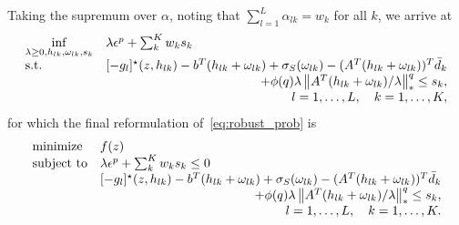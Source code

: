 Taking the supremum over $\alpha$, noting that $\sum_{l=1}^L \alpha_{lk} = w_k$ for all $k$, we arrive at
\begin{equation*}
\begin{aligned}
\begin{array}[t]{ll}
\underset{\lambda \geq 0, h_{lk},\omega_{lk}, s_k}{\inf} & \lambda \epsilon^p + \sum_k^K w_k s_k\\
\mbox{s.t.} & [-g_l]^\star(z,h_{lk}) -b^T(h_{lk} + \omega_{lk}) + \sigma_S(\omega_{lk}) - (A^T(h_{lk} + \omega_{lk}))^T \bar{d}_k \\
& \hfill + \phi(q)\lambda \left\|A^T(h_{lk} + \omega_{lk})/\lambda \right\|^q_* \le s_k,\\
& \hfill l = 1,\dots,L, \quad k = 1,\dots,K,
\end{array}
\end{aligned}
\end{equation*}
for which the final reformulation of~\eqref{eq:robust_prob} is
\begin{equation*}
	\begin{aligned}
	\begin{array}[t]{ll}
	{\text{minimize}} & f(z)\\
	\mbox{subject to} &\lambda \epsilon^p + \sum_k^K w_k s_k \leq 0\\
	 & [-g_l]^\star(z,h_{lk}) -b^T(h_{lk} + \omega_{lk}) + \sigma_S(\omega_{lk}) - (A^T(h_{lk} + \omega_{lk}))^T \bar{d}_k \\
& \hfill + \phi(q)\lambda \left\|A^T(h_{lk} + \omega_{lk})/\lambda \right\|^q_* \le s_k,\\
& \hfill l = 1,\dots,L, \quad k = 1,\dots,K.
	\end{array}
	\end{aligned}
	\end{equation*}